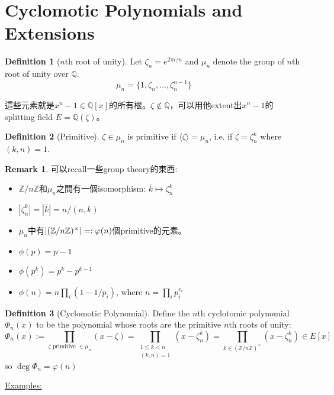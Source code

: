 \documentclass[12pt]{article}
\theoremstyle{definition}
\newcommand{\ex}{\noindent\underline{Examples:}}
\newtheorem{dfn}{Definition}
\newtheorem{rem}{Remark}
\newcommand{\QQ}{\mathbb Q}
\newcommand{\ZZ}{\mathbb Z}
\begin{document}
\section{Cyclomotic Polynomials and Extensions}

\begin{dfn}[$n$th root of unity]
	Let $\zeta_n=e^{2\pi i/n}$ and $\mu_n$ denote the group of $n$th root of unity over $\QQ$.
	\[\mu_n=\{1,\zeta_n,\dots,\zeta_n^{n-1}\}\]
\end{dfn}
這些元素就是$x^n-1\in\QQ[x]$的所有根。$\zeta\notin\QQ$，可以用他extent出$x^n-1$的splitting field $E=\QQ(\zeta)$。

\begin{dfn}[Primitive]
	$\zeta\in \mu_n$ is primitive if $\langle\zeta\rangle=\mu_n$, i.e. if $\zeta=\zeta_n^k$ where $(k,n)=1$.
\end{dfn}

\begin{rem}
	可以recall一些group theory的東西:
	\begin{itemize}
		\item $\ZZ/n\ZZ$和$\mu_n$之間有一個isomorphism: $\overline{k}\mapsto \zeta_n^k$
		\item $|\zeta_n^k|=|\bar{k}|=n/(n,k)$
		\item $\mu_n$中有$\abs{(\ZZ/n\ZZ)^\times}=:\varphi(n)$個primitive的元素。
		\item $\phi(p)=p-1$
		\item $\phi(p^k)=p^k - p^{k-1}$
		\item $\phi(n)=n \prod_i (1-1/p_i)$, where $n=\prod_i p_i^{e_i}$
	\end{itemize}
\end{rem}

\begin{dfn}[Cyclomotic Polynomial]\label{cyclomotic_polynomial}
	Define the $n$th cyclotomic polynomial $\Phi_n(x)$ to be the polynomial whose roots are the primitive $n$th roots of unity:
	\[
		\Phi_n(x):=\prod_{\zeta\text{ primitive }\in \mu_n}(x-\zeta)
		=\prod_{\substack{ 1\le k < n \\ (k,n)=1}}(x-\zeta_n^k)
		=\prod_{\overline{k}\in(\ZZ/n\ZZ)^\times}(x-\zeta_n^k)
		\in E[x]
	\]
	so $\deg \Phi_n = \varphi(n)$
\end{dfn}

\ex
\end{document}
